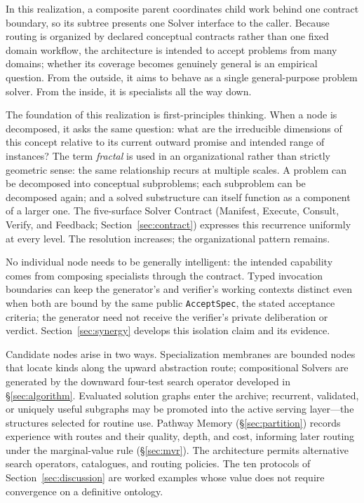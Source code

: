 \documentclass[11pt]{article}
\let\oldtexttt\texttt
\renewcommand{\texttt}[1]{\oldtexttt{\small #1}}
\begin{document}
In this realization, a composite parent coordinates child work behind one contract boundary, so its subtree presents one Solver interface to the caller. Because routing is organized by declared conceptual contracts rather than one fixed domain workflow, the architecture is intended to accept problems from many domains; whether its coverage becomes genuinely general is an empirical question. From the outside, it aims to behave as a single general-purpose problem solver. From the inside, it is specialists all the way down.

The foundation of this realization is first-principles thinking. When a node is decomposed, it asks the same question: what are the irreducible dimensions of this concept relative to its current outward promise and intended range of instances? The term \emph{fractal} is used in an organizational rather than strictly geometric sense: the same relationship recurs at multiple scales. A problem can be decomposed into conceptual subproblems; each subproblem can be decomposed again; and a solved substructure can itself function as a component of a larger one. The five-surface Solver Contract (Manifest, Execute, Consult, Verify, and Feedback; Section~\ref{sec:contract}) expresses this recurrence uniformly at every level. The resolution increases; the organizational pattern remains.

No individual node needs to be generally intelligent: the intended capability comes from composing specialists through the contract. Typed invocation boundaries can keep the generator's and verifier's working contexts distinct even when both are bound by the same public \texttt{AcceptSpec}, the stated acceptance criteria; the generator need not receive the verifier's private deliberation or verdict. Section~\ref{sec:synergy} develops this isolation claim and its evidence.

Candidate nodes arise in two ways. Specialization membranes are bounded nodes that locate kinds along the upward abstraction route; compositional Solvers are generated by the downward four-test search operator developed in \S\ref{sec:algorithm}. Evaluated solution graphs enter the archive; recurrent, validated, or uniquely useful subgraphs may be promoted into the active serving layer---the structures selected for routine use. Pathway Memory (\S\ref{sec:partition}) records experience with routes and their quality, depth, and cost, informing later routing under the marginal-value rule (\S\ref{sec:mvr}). The architecture permits alternative search operators, catalogues, and routing policies. The ten protocols of Section~\ref{sec:discussion} are worked examples whose value does not require convergence on a definitive ontology.
\end{document}

